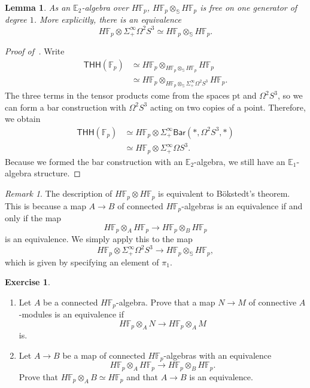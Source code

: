 \documentclass[10pt, oneside]{memoir}
\newtheorem{lem}[thm]{Lemma}
\theoremstyle{definition}
\newtheorem{exer}[thm]{Exercise}
\theoremstyle{remark}
\newtheorem{rmk}[thm]{Remark}
\theoremstyle{plain}
\theoremstyle{definition}
\theoremstyle{remark}
\newcommand{\E}{\mathbb{E}}
\newcommand{\F}{\mathbb{F}}
\newcommand{\bS}{\mathbb{S}}
\newcommand{\mr}[1]{\mathrm{#1}}
\newcommand{\ms}[1]{\mathsf{#1}}
\newcommand{\1}{\mathbf{1}}
\newcommand{\2}{\mathbf{2}}
\newcommand{\3}{\mathbf{3}}
\newcommand{\THH}{\ms{THH}}
\begin{document}
\begin{lem}\label{lem:tensorproduct}
    As an $\E_2$-algebra over $H \F_p$, $H \F_p \otimes_{\bS} H \F_p$ is free on one generator of degree $1$. More explicitly, there is an equivalence
    \[ H \F_p \otimes \Sigma_+^{\infty} \Omega^2 S^3 \simeq H \F_p \otimes_{\bS} H \F_p. \]
\end{lem}

\begin{proof}[Proof of~]
    Write
    \begin{align*}
        \THH(\F_p) &\simeq H \F_p \otimes_{H \F_p \otimes_{\bS} H \F_p} H \F_p \\
        &\simeq H \F_p \otimes_{H \F_p \otimes_{\bS} \Sigma_+^{\infty}\Omega^2 S^3} H \F_p.
    \end{align*}
    The three terms in the tensor products come from the spaces $\mr{pt}$ and $\Omega^2 S^3$, so we can form a bar construction with $\Omega^2 S^3$ acting on two copies of a point. Therefore, we obtain
    \begin{align*}
        \THH(\F_p) &\simeq H \F_p \otimes \Sigma_+^{\infty} \ms{Bar}(*, \Omega^2 S^3, *) \\
        &\simeq H \F_p \otimes \Sigma_+^{\infty} \Omega S^3.
    \end{align*}
    Because we formed the bar construction with an $\E_2$-algebra, we still have an $\E_1$-algebra structure.
\end{proof}

\begin{rmk}
    The description of $H \F_p \otimes H \F_p$ is equivalent to B\"okstedt's theorem. This is because a map $A \to B$ of connected $H \F_p$-algebras is an equivalence if and only if the map
    \[ H \F_p \otimes_A H \F_p \to H \F_p \otimes_B H \F_p \]
    is an equivalence. We simply apply this to the map
    \[ H \F_p \otimes \Sigma_+^{\infty} \Omega^2 S^3 \to H \F_p \otimes_{\bS} H \F_p, \]
    which is given by specifying an element of $\pi_1$.
\end{rmk}

\begin{exer}\leavevmode
    \begin{enumerate}
        \item Let $A$ be a connected $H \F_p$-algebra. Prove that a map $N \to M$ of connective $A$-modules is an equivalence if
        \[ H \F_p \otimes_A N \to H \F_p \otimes_A M \]
        is.
        \item Let $A \to B$ be a map of connected $H \F_p$-algebras with an equivalence
        \[ H \F_p \otimes_A H \F_p \to H \F_p \otimes_B H \F_p. \]
        Prove that $H \F_p \otimes_A B \simeq H \F_p$ and that $A \to B$ is an equivalence.
    \end{enumerate}
\end{exer}
\end{document}

